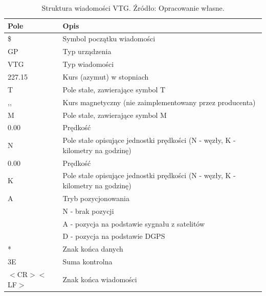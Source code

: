 \begin{table}[H]
\centering
\caption{Struktura wiadomości VTG. Źródło: Opracowanie własne.}
\label{table:table_nmea_vtg_message}
\begin{tabular}{| l | l |}
\hline
\textbf{Pole} & \textbf{Opis} \\ \hline
\$ & Symbol początku wiadomości  \\ \hline
GP & Typ urządzenia  \\ \hline
VTG & Typ wiadomości  \\ \hline
227.15 & Kurs (azymut) w stopniach \\ \hline
T & Pole stałe, zawierające symbol T \\ \hline
,, & Kurs magnetyczny (nie zaimplementowany przez producenta) \\ \hline
M & Pole stałe, zawierające symbol M \\ \hline
0.00 & Prędkość \\ \hline
N & Pole stałe opisujące jednostki prędkości (N - węzły, K - kilometry na godzinę) \\ \hline
0.00 & Prędkość \\ \hline
K & Pole stałe opisujące jednostki prędkości (N - węzły, K - kilometry na godzinę) \\ \hline
A & Tryb pozycjonowania \\
  & N - brak pozycji \\
  & A - pozycja na podstawie sygnału z satelitów \\
  & D - pozycja na podstawie DGPS \\ \hline
* & Znak końca danych \\ \hline
3E & Suma kontrolna \\ \hline
$<$CR$><$LF$>$ & Znak końca wiadomości \\ \hline
\end{tabular}
\end{table}

